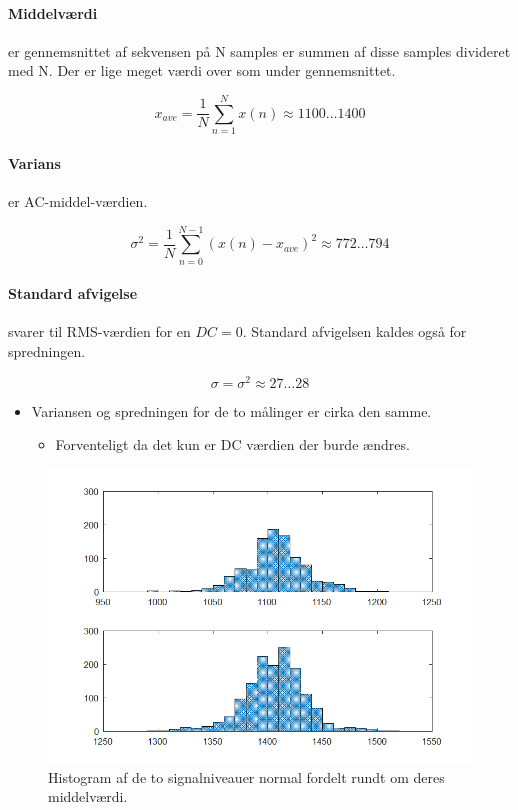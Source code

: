 \documentclass[danish]{article}
\begin{document}
\paragraph{Middelværdi} er gennemsnittet af sekvensen på N samples er summen af disse samples divideret med N. Der er lige meget værdi over som under gennemsnittet.

\begin{equation}
x_{ave} = \frac{1}{N} \sum_{n=1}^{N}x(n) \approx 1100  \ldots 1400
\end{equation}

\paragraph{Varians} er AC-middel-værdien.

\begin{equation}
{\sigma}^2 = \frac{1}{N} \sum_{n=0}^{N-1}(x(n)-x_{ave})^2 \approx 772  \ldots 794
\end{equation}

\paragraph{Standard afvigelse} svarer til RMS-værdien for en $DC=0$. Standard afvigelsen kaldes også for spredningen. 

\begin{equation}
{\sigma} = {\sigma}^2 \approx 27  \ldots 28
\end{equation}

\begin{itemize}
	\item Variansen og spredningen for de to målinger er cirka den samme. 
	\begin{itemize}
		\item Forventeligt da det kun er DC værdien der burde ændres.
	\end{itemize}
\end{itemize}

\begin{figure}[H]
	\centering
	\includegraphics[width=0.42\linewidth]{graphics/case3_2}
	\caption{Histogram af de to signalniveauer normal fordelt rundt om deres middelværdi.}
	\label{fig:case3_2}
\end{figure}
\end{document}
